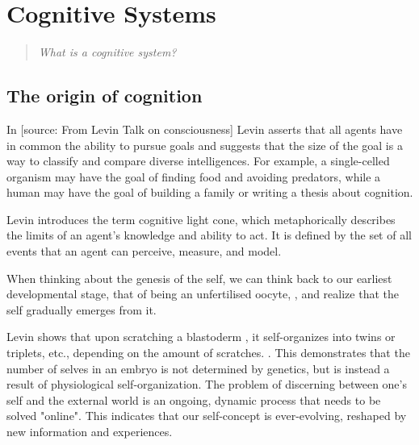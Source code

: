 \section{Cognitive Systems}
\begin{quotation}
    \emph{What is a cognitive system?}
\end{quotation}

\subsection{The origin of cognition} 

In [source: From Levin Talk on consciousness] Levin asserts that all agents have in common the ability to pursue goals and suggests that the size of the goal is a way to classify and compare diverse intelligences. For example, a single-celled organism may have the goal of finding food and avoiding predators, while a human may have the goal of building a family or writing a thesis about cognition.

Levin introduces the term \gls{cognitive light cone}, which metaphorically describes the limits of an agent's knowledge and ability to act. It is defined by the set of all events that an agent can perceive, measure, and model.

When thinking about the genesis of the self, we can think back to our earliest developmental stage, that of being an unfertilised \gls{oocyte}, , and realize that the self gradually emerges from it.

Levin shows that upon scratching a \gls{blastoderm} , it self-organizes into twins or triplets, etc., depending on the amount of scratches. . This demonstrates that the number of selves in an \gls{embryo} is not determined by genetics, but is instead a result of physiological self-organization. The problem of discerning between one's self and the external world is an ongoing, dynamic process that needs to be solved "online". This indicates that our self-concept is ever-evolving, reshaped by new information and experiences.

